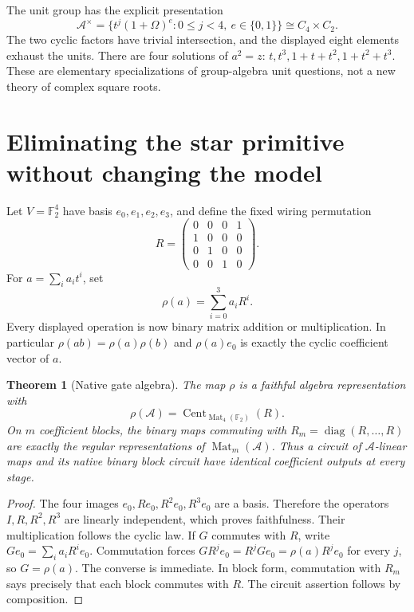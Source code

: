 \documentclass[11pt,a4paper]{article}
\newtheorem{theorem}{Theorem}[section]
\theoremstyle{definition}\newtheorem{definition}[theorem]{Definition}
\theoremstyle{remark}\newtheorem{remark}[theorem]{Remark}
\newcommand{\F}{\mathbb F}
\newcommand{\A}{\mathcal A}
\newcommand{\diag}{\operatorname{diag}}
\newcommand{\Cent}{\operatorname{Cent}}
\newcommand{\Mat}{\operatorname{Mat}}
\numberwithin{equation}{section}
\begin{document}
The unit group has the explicit presentation
\[
 \A^\times=\{t^j(1+\Omega)^e:0\le j<4,\ e\in\{0,1\}\}\cong C_4\times C_2.
\]
The two cyclic factors have trivial intersection, and the displayed eight elements exhaust the units. There are four solutions of $a^2=z$: $t,t^3,1+t+t^2,1+t^2+t^3$. These are elementary specializations of group-algebra unit questions, not a new theory of complex square roots.

\section{Eliminating the star primitive without changing the model}\label{sec:native}
Let $V=\F_2^4$ have basis $e_0,e_1,e_2,e_3$, and define the fixed wiring permutation
\[
 R=\begin{pmatrix}0&0&0&1\\1&0&0&0\\0&1&0&0\\0&0&1&0\end{pmatrix}.
\]
For $a=\sum_i a_i t^i$, set
\begin{equation}\label{eq:rho}
 \rho(a)=\sum_{i=0}^3 a_iR^i.
\end{equation}
Every displayed operation is now binary matrix addition or multiplication. In particular $\rho(ab)=\rho(a)\rho(b)$ and $\rho(a)e_0$ is exactly the cyclic coefficient vector of $a$.

\begin{theorem}[Native gate algebra]\label{thm:centralizer}
The map $\rho$ is a faithful algebra representation with
\[
 \rho(\A)=\Cent_{\Mat_4(\F_2)}(R).
\]
On $m$ coefficient blocks, the binary maps commuting with
$R_m=\diag(R,\ldots,R)$ are exactly the regular representations of $\Mat_m(\A)$. Thus a circuit of $\A$-linear maps and its native binary block circuit have identical coefficient outputs at every stage.
\end{theorem}
\begin{proof}
The four images $e_0,Re_0,R^2e_0,R^3e_0$ are a basis. Therefore the operators $I,R,R^2,R^3$ are linearly independent, which proves faithfulness. Their multiplication follows the cyclic law. If $G$ commutes with $R$, write $Ge_0=\sum_i a_iR^ie_0$. Commutation forces
$G R^j e_0=R^jGe_0=\rho(a)R^je_0$ for every $j$, so $G=\rho(a)$. The converse is immediate. In block form, commutation with $R_m$ says precisely that each block commutes with $R$. The circuit assertion follows by composition.
\end{proof}
\end{document}
